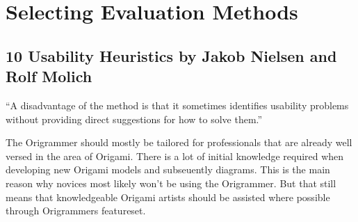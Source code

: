 
\section{Selecting Evaluation Methods}
\label{sec:evaluationMethods}

\subsection{10 Usability Heuristics by Jakob Nielsen and Rolf Molich}

\enquote{A disadvantage of the method is that it sometimes identifies usability problems without providing direct suggestions for how to solve them.}\cite{10usability_heuristics}


The Origrammer should mostly be tailored for professionals that are already well versed in the area of Origami. There is a lot of initial knowledge required when developing new Origami models and subseuently diagrams. This is the main reason why novices most likely won't be using the Origrammer. But that still means that knowledgeable Origami artists should be assisted where possible through Origrammers featureset.